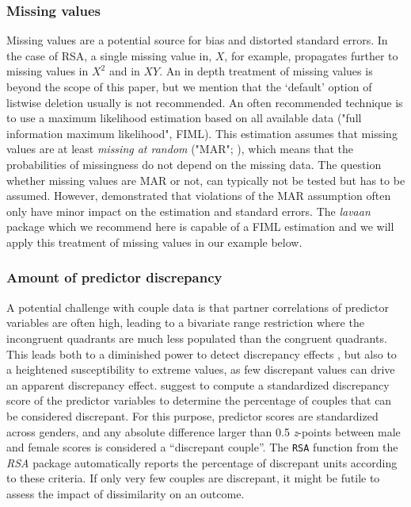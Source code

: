 \documentclass[jou,a4paper,draftfirst]{apa6}
\newcommand{\added}[1]{#1}
\begin{document}
\subsubsection{Missing values}
Missing values are a potential source for bias and distorted standard errors. In the case of RSA, a single missing value in, $X$, for example, propagates further to missing values in $X^2$ and in $XY$. An in depth treatment of missing values is beyond the scope of this paper, but we mention that the `default' option of listwise deletion usually is not recommended. An often recommended technique is to use a maximum likelihood estimation based on all available data ("full information maximum likelihood", FIML). This estimation assumes that missing values are at least \emph{missing at random} ("MAR"; ), which means that the probabilities of missingness do not depend on the missing data. The question whether missing values are MAR or not, can typically not be tested but has to be assumed. However, \textcite{collins_comparison_2001} demonstrated that violations of the MAR assumption often only have minor impact on the estimation and standard errors. The \emph{lavaan} package which we recommend here is capable of a FIML estimation and we will apply this treatment of missing values in our example below.


\subsubsection{Amount of predictor discrepancy}
A potential challenge with couple data is that partner correlations of predictor variables are often high, leading to a bivariate range restriction where the incongruent quadrants are much less populated than the congruent quadrants. This leads both to a diminished power to detect discrepancy effects \parencite{McClelland_Judd_1993}, but also to a heightened susceptibility to extreme values, as few discrepant values can drive an apparent discrepancy effect. \textcite{shanock_polynomial_2010} suggest to compute a standardized discrepancy score of the predictor variables to determine the percentage of couples that can be considered discrepant. For this purpose, predictor scores are standardized \added{across} genders, and any absolute difference larger than 0.5 \textit{z}-points between male and female scores is considered a ``discrepant couple''. The {\tt RSA} function from the \textit{RSA} package automatically reports the percentage of discrepant units according to these criteria. If only very few couples are discrepant, it might be futile to assess the impact of dissimilarity on an outcome. 
\end{document}
